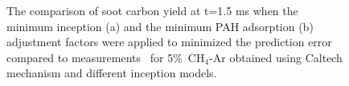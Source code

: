 \begin{figure}[H]
	\centering
	\caption{The comparison of soot carbon yield at t=1.5 ms when the minimum inception (a) and the minimum PAH adsorption (b) adjustment factors were applied to minimized the prediction error compared to measurements~\citep{agafonov2016unified} for 5\%~$\mathrm{CH_4}$-Ar obtained using Caltech mechanism and different inception models.}
	\label{fig:shockagof_yield_maxincads_cpr} 
\end{figure}


